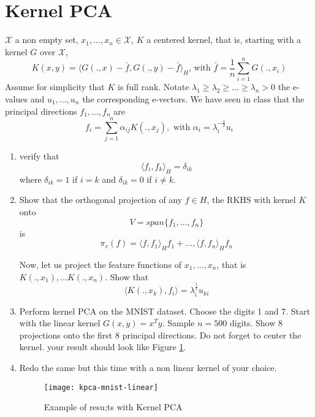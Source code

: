 \documentclass[12pt]{article}
\begin{document}
\section{Kernel PCA}
$\mathcal{X}$ a non empty set, $x_1,\ldots,x_n \in \mathcal{X}$, $K$ a centered kernel, that is, starting with a kernel $G$ over $\mathcal{X}$, 
  \begin{equation}
K(x,y)=\langle G(.,x)- \bar{f}, G(.,y)-\bar{f}\rangle_H \mbox{, with } \bar{f}=\frac{1}{n}\sum_{i=1}^n G(.,x_i)
\end{equation}
Assume for simplicity that $K$ is full rank. Notate $\lambda_1 \geq \lambda_2 \geq \ldots \geq \lambda_n>0$ the e-values and $u_1,\ldots,u_n$ the corresponding e-vectors. 
We have seen in class that the principal directions $f_1,\ldots,f_n$ are 
\begin{equation}
f_i=\sum_{j=1}^n \alpha_{ij} K(.,x_j), \mbox{ with } \alpha_i = \lambda_i^{-\frac{1}{2}}u_i
\end{equation}
\begin{enumerate}
\item verify that 
\begin{equation}
\langle f_i,f_k \rangle_H=\delta_{ik}
\end{equation}
where $\delta_{ik}=1$ if $i=k$ and $\delta_{ik}=0$ if $i \not = k$. 
\item Show that the orthogonal projection of any $f \in H$, the RKHS with kernel $K$ onto 
\begin{equation}
V=span\{f_1,\ldots,f_n\}
\end{equation} is 
\begin{equation}
\pi_v(f)=\langle f,f_1\rangle_H f_1+\ldots,\langle f,f_n\rangle_H f_n
\end{equation}

Now, let us project the feature functions of $x_1,\ldots,x_n$, that is $K(.,x_1), \ldots K(.,x_n)$. Show that 
 \begin{equation}
\langle K(.,x_k),f_i \rangle = \lambda_i^\frac{1}{2} u_{ki}
\end{equation}
\item Perform kernel PCA on the MNIST dataset. Choose the digits 1 and 7. Start with the linear kernel $G(x,y)=x^Ty$. Sample $n=500$ digits. Show 8 projections onto the first 8 principal directions. Do not forget to center the kernel. your result should look like Figure \ref{fig:kpca}. 
\item Redo the same but this time with a non linear kernel of your choice. 
\begin{figure}
\texttt{[image: kpca-mnist-linear]}
\caption{\label{fig:kpca}Example of resu;ts with Kernel PCA}
\end{figure}
 
\end{enumerate}
\end{document}
